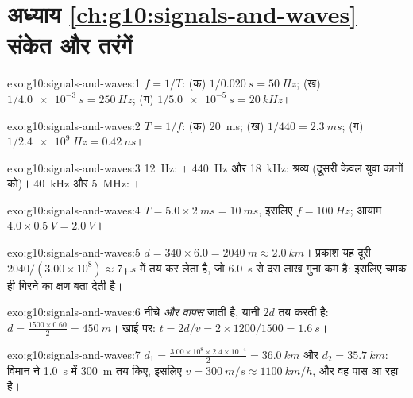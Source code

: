 \section*{अध्याय \ref{ch:g10:signals-and-waves} --- संकेत और तरंगें}

\begin{solution}{exo:g10:signals-and-waves:1}
$f = 1/T$: (क) $1/\qty{0.020}{s} = \qty{50}{Hz}$; (ख) $1/\qty{4.0e-3}{s} = \qty{250}{Hz}$; (ग) $1/\qty{5.0e-5}{s} = \qty{20}{kHz}$।
\end{solution}

\begin{solution}{exo:g10:signals-and-waves:2}
$T = 1/f$: (क) \qty{20}{ms}; (ख) $1/440 = \qty{2.3}{ms}$; (ग) $1/\qty{2.4e9}{Hz} = \qty{0.42}{ns}$।
\end{solution}

\begin{solution}{exo:g10:signals-and-waves:3}
\qty{12}{Hz}: । \qty{440}{Hz} और \qty{18}{kHz}: श्रव्य (दूसरी केवल युवा
कानों को)। \qty{40}{kHz} और \qty{5}{MHz}: ।
\end{solution}

\begin{solution}{exo:g10:signals-and-waves:4}
$T = 5.0 \times \qty{2}{ms} = \qty{10}{ms}$, इसलिए $f = \qty{100}{Hz}$; आयाम $4.0 \times \qty{0.5}{V} = \qty{2.0}{V}$।
\end{solution}

\begin{solution}{exo:g10:signals-and-waves:5}
$d = 340 \times 6.0 = \qty{2040}{m} \approx \qty{2.0}{km}$। प्रकाश यह दूरी $2040/(3.00\times10^{8}) \approx \qty{7}{\micro s}$ में तय कर लेता है, जो \qty{6.0}{s} से दस लाख
गुना कम है: इसलिए चमक ही गिरने का क्षण बता देती है।
\end{solution}

\begin{solution}{exo:g10:signals-and-waves:6}
 नीचे \emph{और वापस} जाती है, यानी $2d$ तय करती है:
$d = \frac{1500 \times 0.60}{2} = \qty{450}{m}$। खाई पर: $t = 2d/v = 2 \times 1200/1500 = \qty{1.6}{s}$।
\end{solution}

\begin{solution}{exo:g10:signals-and-waves:7}
$d_1 = \frac{3.00\times10^{8} \times 2.4\times10^{-4}}{2} =
\qty{36.0}{km}$ और $d_2 = \qty{35.7}{km}$: विमान ने \qty{1.0}{s} में \qty{300}{m} तय किए, इसलिए $v = \qty{300}{m/s} \approx
\qty{1100}{km/h}$, और वह
पास आ रहा है।
\end{solution}

